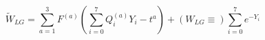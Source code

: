 \begin{equation}
\label{eq:WLG3}
\tilde{W}_{LG}=\sum_{a=1}^3F^{(a)}(\sum_{i=0}^7Q^{(a)}_iY_i-t^a)+(W_{LG}\equiv)
\sum_{i=0}^7e^{-Y_i}
\end{equation}

